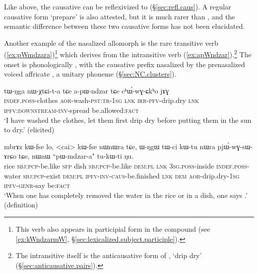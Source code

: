 Like  above, the causative  can be reflexivized to  (§\ref{sec:refl.caus}).  A regular causative form  `prepare' is also attested, but it is much rarer than , and the semantic difference between these two causative forms has not been elucidated.

Another example of the nasalized  allomorph is the rare transitive verb   (\ref{ex:pWmdzara})\footnote{This verb also appears in participial form in the compound  (see \ref{ex:kWndzarmW}, §\ref{sec:lexicalized.subject.participle}). } which derives from the intransitive verb   (\ref{ex:apWndzar}).\footnote{The intransitive  itself is the anticausative form of , `drip dry' (§\ref{sec:anticausative.pairs}). } The onset  is phonologically , with the causative  prefix nasalized by the prenasalized voiced affricate , a unitary phoneme (§\ref{sec:NC.clusters}).

\begin{exe}
\ex \label{ex:apWndzar}
\gll  tɯ-ŋga nɯ-χtɕi-t-a tɕe a-pɯ-ndzar tɕe cʰɯ́-wɣ-ɕkʰo jɤɣ \\
\textsc{indef}.\textsc{poss}-clothes \textsc{aor}-wash-\textsc{pst}:\textsc{tr}-\textsc{1sg} \textsc{lnk} \textsc{irr}-\textsc{pfv}-drip.dry \textsc{lnk} \textsc{ipfv}:\textsc{downstream}-\textsc{inv}-spread be.allowed:\textsc{fact} \\
\glt `I have washed the clothes, let them first drip dry before putting them in the sun to dry.' (elicited)
\end{exe}
 
\begin{exe}
\ex \label{ex:pWmdzara}
\gll mbrɤz kɯ-fse lo, <cai> kɯ-fse nɯnɯra tɕe, ɯ-ŋgɯ tɯ-ci kɯ-tu nɯra pjɯ́-wɣ-sɯ-ɤrɕo tɕe, nɯnɯ ``pɯ-mdzar-a" tu-kɯ-ti ŋu. \\
rice \textsc{sbj}:\textsc{pcp}-be.like \textsc{sfp} dish  \textsc{sbj}:\textsc{pcp}-be.like  \textsc{dem}:\textsc{pl} \textsc{lnk}  \textsc{3sg}.\textsc{poss}-inside \textsc{indef}.\textsc{poss}-water \textsc{sbj}:\textsc{pcp}-exist \textsc{dem}:\textsc{pl} \textsc{ipfv}-\textsc{inv}-\textsc{caus}-be.finished \textsc{lnk} \textsc{dem} \textsc{aor}-drip.dry-\textsc{1sg} \textsc{ipfv}-\textsc{genr}-say be:\textsc{fact} \\
\glt `When one has completely removed the water in the rice or in a dish, one says .' (definition)
\end{exe} 
 
